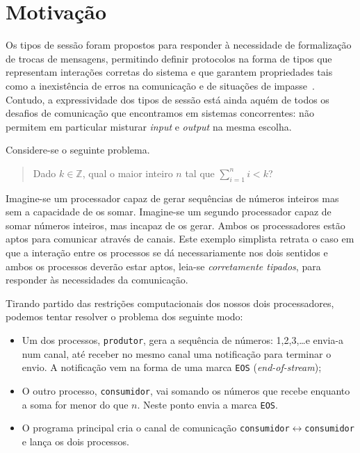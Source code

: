 \section{Motivação}

Os tipos de sessão foram propostos para responder à necessidade de
formalização de trocas de mensagens, permitindo definir protocolos na
forma de tipos que representam interações corretas do sistema e que
garantem propriedades tais como a inexistência de erros na comunicação
e de situações de impasse~\cite{ref-lang-primitives}. Contudo, a
expressividade dos tipos de sessão está ainda aquém de todos os
desafios de comunicação que encontramos em sistemas concorrentes: não
permitem em particular misturar \textit{input} e \textit{output} na
mesma escolha.

Considere-se o seguinte problema.
%
\begin{quotation}
	Dado $k\in\mathbb{Z}$, qual o maior inteiro $n$ tal que
	$\sum_{i=1}^n i < k$?
\end{quotation}

Imagine-se um processador capaz de gerar sequências de números
inteiros mas sem a capacidade de os somar. Imagine-se um segundo
processador capaz de somar números inteiros, mas incapaz de os
gerar. Ambos os processadores estão aptos para comunicar através de
canais.
%
Este exemplo simplista retrata o caso em que a interação entre
os processos se dá necessariamente nos dois sentidos e ambos 
os processos deverão
estar aptos, leia-se \emph{corretamente tipados}, para responder 
às necessidades da comunicação.

Tirando partido das restrições computacionais dos nossos dois
processadores, podemos tentar resolver o problema dos seguinte modo:
%
\begin{itemize}
\item Um dos processos, \lstinline|produtor|, gera a sequência de
  números: 1,2,3,\dots e envia-a num canal, até receber no mesmo
  canal uma notificação para terminar o envio. A notificação vem na
  forma de uma marca \lstinline|EOS| (\textit{end-of-stream});
\item O outro processo, \lstinline|consumidor|, vai somando os números
  que recebe enquanto a soma for menor do que $n$. Neste ponto envia a
  marca \lstinline|EOS|.
\item O programa principal cria o canal de comunicação
  \lstinline|consumidor|$\leftrightarrow$\lstinline|consumidor| e
  lança os dois processos.
\end{itemize}

